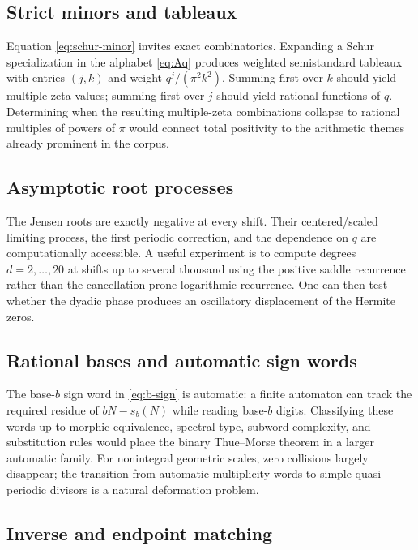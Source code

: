 \documentclass[11pt]{article}
\numberwithin{equation}{section}
\theoremstyle{definition}
\theoremstyle{remark}
\begin{document}
\subsection{Strict minors and tableaux}

Equation \eqref{eq:schur-minor} invites exact combinatorics.  Expanding a Schur specialization in the alphabet \eqref{eq:Aq} produces weighted semistandard tableaux with entries $(j,k)$ and weight $q^j/(\pi^2k^2)$.  Summing first over $k$ should yield multiple-zeta values; summing first over $j$ should yield rational functions of $q$.  Determining when the resulting multiple-zeta combinations collapse to rational multiples of powers of $\pi$ would connect total positivity to the arithmetic themes already prominent in the corpus.

\subsection{Asymptotic root processes}

The Jensen roots are exactly negative at every shift.  Their centered/scaled limiting process, the first periodic correction, and the dependence on $q$ are computationally accessible.  A useful experiment is to compute degrees $d=2,\ldots,20$ at shifts up to several thousand using the positive saddle recurrence rather than the cancellation-prone logarithmic recurrence.  One can then test whether the dyadic phase produces an oscillatory displacement of the Hermite zeros.

\subsection{Rational bases and automatic sign words}

The base-$b$ sign word in \eqref{eq:b-sign} is automatic: a finite automaton can track the required residue of $bN-s_b(N)$ while reading base-$b$ digits.  Classifying these words up to morphic equivalence, spectral type, subword complexity, and substitution rules would place the binary Thue--Morse theorem in a larger automatic family.  For nonintegral geometric scales, zero collisions largely disappear; the transition from automatic multiplicity words to simple quasi-periodic divisors is a natural deformation problem.

\subsection{Inverse and endpoint matching}
\end{document}

